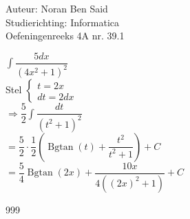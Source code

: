 \documentclass[a4paper]{article}
\begin{document}
  
\noindent \large Auteur: Noran Ben Said \\
\noindent \large Studierichting: Informatica\\
\noindent \large Oefeningenreeks 4A nr. 39.1\\

\medskip

\normalsize

$ \displaystyle\int \dfrac{5 dx}{(4x^2 + 1)^2} $ \\

Stel  
$
\left\{
   \begin{array}{l}
       t = 2x \\
       dt = 2 dx
   \end{array}
\right.
$ \\

$ \Rightarrow \dfrac{5}{2} \displaystyle\int \dfrac{dt}{(t^2 + 1)^2} $ \\

$ = \dfrac{5}{2} \cdot \dfrac{1}{2} \left( \operatorname{Bgtan} (t) + \dfrac{t^2}{t^2 + 1} \right) + C $ \\

$ = \dfrac{5}{4} \operatorname{Bgtan} (2x) + \dfrac{10x}{4((2x)^2 + 1)} + C $ \\


\begin{thebibliography}{999}
\end{thebibliography}
\end{document}
